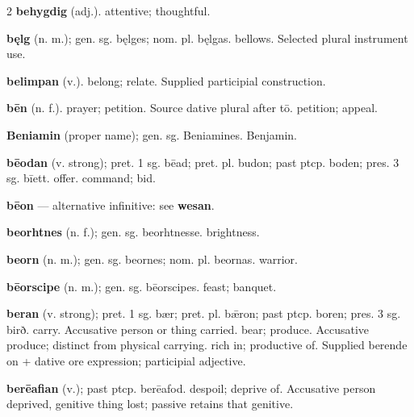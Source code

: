 \begin{multicols*}{2}
\textbf{behygdig} (adj.). attentive; thoughtful.\par
\textbf{bęlg} (n. m.); gen. sg. bęlges; nom. pl. bęlgas. bellows. Selected plural instrument use.\par
\textbf{belimpan} (v.). belong; relate. Supplied participial construction.\par
\textbf{bēn} (n. f.). prayer; petition. Source dative plural after tō. petition; appeal.\par
\textbf{Beniamin} (proper name); gen. sg. Beniamines. Benjamin.\par
\textbf{bēodan} (v. strong); pret. 1 sg. bēad; pret. pl. budon; past ptcp. boden; pres. 3 sg. bīett. offer. command; bid.\par
\textbf{bēon} — alternative infinitive: see \textbf{wesan}.\par
\textbf{beorhtnes} (n. f.); gen. sg. beorhtnesse. brightness.\par
\textbf{beorn} (n. m.); gen. sg. beornes; nom. pl. beornas. warrior.\par
\textbf{bēorscipe} (n. m.); gen. sg. bēorscipes. feast; banquet.\par
\textbf{beran} (v. strong); pret. 1 sg. bær; pret. pl. bǣron; past ptcp. boren; pres. 3 sg. birð. carry. Accusative person or thing carried. bear; produce. Accusative produce; distinct from physical carrying. rich in; productive of. Supplied berende on + dative ore expression; participial adjective.\par
\textbf{berēafian} (v.); past ptcp. berēafod. despoil; deprive of. Accusative person deprived, genitive thing lost; passive retains that genitive.\par

\end{multicols*}
